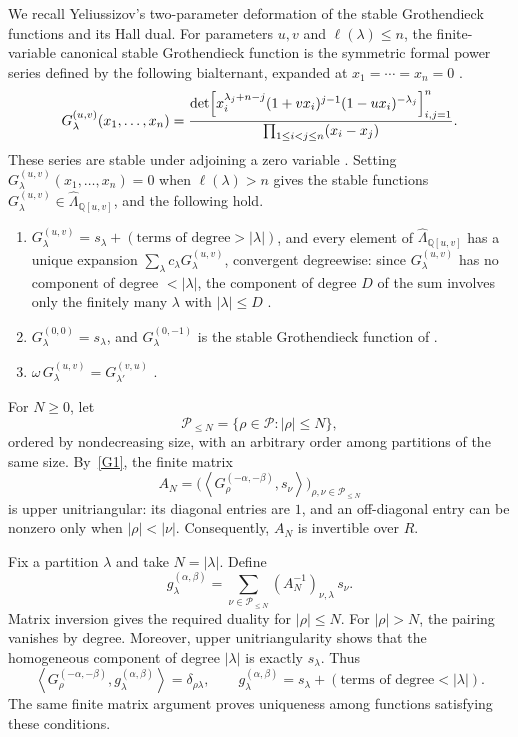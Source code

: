 \documentclass[11pt]{amsart}
\DeclareRobustCommand{\S}{\ensuremath{\mathsection}}
\numberwithin{equation}{section}
\theoremstyle{definition}
\theoremstyle{remark}
\newcommand{\hLam}{\widehat\Lambda}
\newcommand{\Par}{\mathcal P}
\newcommand{\Hall}[2]{\left\langle #1,#2\right\rangle}
\newcommand{\QQ}{\mathbb Q}
\begin{document}
We recall Yeliussizov's two-parameter deformation of the stable
Grothendieck functions and its Hall dual. For parameters $u,v$ and $\ell(\lambda)\leq n$, the finite-variable
canonical stable Grothendieck function is the symmetric formal power
series defined by the following bialternant, expanded at
$x_1=\cdots=x_n=0$ \cite[Def.~3.1]{Yeliussizov}. 
\begin{equation}\label{eq:canonical-determinant}
 G^{(u,v)}_\lambda(x_1,\dots,x_n)
 =\frac{\det\Bigl[x_i^{\lambda_j+n-j}(1+vx_i)^{j-1}(1-ux_i)^{-\lambda_j}\Bigr]_{i,j=1}^n}
       {\prod_{1\leq i<j\leq n}(x_i-x_j)} .
\end{equation}
These series are stable under adjoining a zero variable
\cite[\S3]{Yeliussizov}.  Setting
$G^{(u,v)}_\lambda(x_1,\ldots,x_n)=0$ when $\ell(\lambda)>n$ gives the
stable functions $G^{(u,v)}_\lambda\in\hLam_{\QQ[u,v]}$, and the following hold.
\begin{enumerate}[label=\textup{(G\arabic*)}]
\item\label{G1} $G^{(u,v)}_\lambda=s_\lambda+(\text{terms of degree}>|\lambda|)$,
and every element of $\hLam_{\QQ[u,v]}$ has a unique expansion $\sum_\lambda c_\lambda G^{(u,v)}_\lambda$, convergent degreewise:
since $G^{(u,v)}_\lambda$ has no component of degree $<|\lambda|$, the component of
degree $D$ of the sum involves only the finitely many $\lambda$ with $|\lambda|\leq D$
\cite[\S3, after Def.~3.1]{Yeliussizov}.
\item\label{G2} $G^{(0,0)}_\lambda=s_\lambda$, and $G^{(0,-1)}_\lambda$ is the
stable Grothendieck function of \cite{Buch} \cite[\S3, after
Ex.~3.2]{Yeliussizov}.
\item\label{G3} $\omega\,G^{(u,v)}_\lambda=G^{(v,u)}_{\lambda'}$
\cite[Thm.~5.4]{Yeliussizov}.
\end{enumerate}

For $N\geq0$, let
\[
 \Par_{\leq N}=\{\rho\in\Par:|\rho|\leq N\},
\]
ordered by nondecreasing size, with an arbitrary order among
partitions of the same size. By~\ref{G1}, the finite matrix
\[
 A_N=
 \bigl(\Hall{G^{(-\alpha,-\beta)}_\rho}{s_\nu}\bigr)
 _{\rho,\nu\in\Par_{\leq N}}
\]
is upper unitriangular: its diagonal entries are $1$, and an
off-diagonal entry can be nonzero only when $|\rho|<|\nu|$.
Consequently, $A_N$ is invertible over $R$.

Fix a partition $\lambda$ and take $N=|\lambda|$. Define
\[
 g^{(\alpha,\beta)}_\lambda
 =\sum_{\nu\in\Par_{\leq N}}
   (A_N^{-1})_{\nu,\lambda}\,s_\nu.
\]
Matrix inversion gives the required duality for $|\rho|\leq N$.
For $|\rho|>N$, the pairing vanishes by degree.
Moreover, upper unitriangularity shows that the homogeneous
component of degree $|\lambda|$ is exactly $s_\lambda$.
Thus
\begin{equation}\label{eq:duality}
 \Hall{G^{(-\alpha,-\beta)}_\rho}
       {g^{(\alpha,\beta)}_\lambda}
 =\delta_{\rho\lambda},
 \qquad
 g^{(\alpha,\beta)}_\lambda
 =s_\lambda+(\text{terms of degree}<|\lambda|).
\end{equation}
The same finite matrix argument proves uniqueness among functions
satisfying these conditions.
\end{document}
